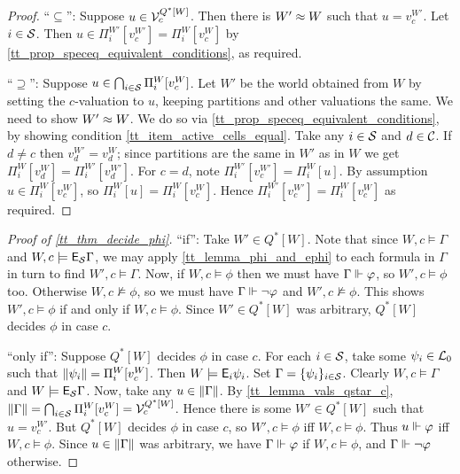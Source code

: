 \begin{proof}
    ``$\subseteq$'': Suppose $u \in \mathcal{V}^{Q^*[W]}_c$. Then there is $W' \approx
    W$ such that $u = v^{W'}_c$. Let $i \in \mathcal{S}$. Then $u \in
    \Pi^{W'}_i[v^{W'}_c] = \Pi^W_i[v^W_c]$ by
    \cref{tt_prop_speceq_equivalent_conditions}, as required.

    ``$\supseteq$'': Suppose $u \in \bigcap_{i \in \mathcal{S}}{\Pi^W_i[v^W_c]}$. Let
    $W'$ be the world obtained from $W$ by setting the $c$-valuation to $u$,
    keeping partitions and other valuations the same. We need to show $W'
    \approx W$. We do so via \cref{tt_prop_speceq_equivalent_conditions}, by
    showing condition \cref{tt_item_active_cells_equal}. Take any $i \in
    \mathcal{S}$ and $d \in \mathcal{C}$. If $d \ne c$ then $v^{W'}_d = v^W_d$; since
    partitions are the same in $W'$ as in $W$ we get $\Pi^W_i[v^W_d] =
    \Pi^{W'}_i[v^{W'}_d]$. For $c = d$, note $\Pi^{W'}_i[v^{W'}_c] =
    \Pi^W_i[u]$. By assumption $u \in \Pi^W_i[v^W_c]$, so $\Pi^W_i[u] =
    \Pi^W_i[v^W_c]$. Hence $\Pi^{W'}_i[v^{W'}_c] = \Pi^W_i[v^W_c]$ as required.
\end{proof}

\begin{proof}[Proof of \cref{tt_thm_decide_phi}]
    ``if'': Take $W' \in Q^*[W]$. Note that since $W, c \models \Gamma$ and $W,
    c \models \mathsf{E}_{\mathcal{S}}\Gamma$, we may apply \cref{tt_lemma_phi_and_ephi} to each
    formula in $\Gamma$ in turn to find $W', c \models \Gamma$. Now, if $W, c
    \models \phi$ then we must have $\Gamma \Vdash \varphi$, so $W', c
    \models \phi$ too. Otherwise $W, c \not\models \phi$, so we must have
    $\Gamma \Vdash \neg\varphi$ and $W', c \not\models \phi$. This shows $W',
    c \models \phi$ if and only if $W, c \models \phi$. Since $W' \in Q^*[W]$
    was arbitrary, $Q^*[W]$ decides $\phi$ in case $c$.

    ``only if'': Suppose $Q^*[W]$ decides $\phi$ in case $c$. For each $i \in
    \mathcal{S}$, take some $\psi_i \in \mathcal{L}_0$ such that $\|{\psi_i}\| =
    \Pi^W_i[v^W_c]$. Then $W \models \mathsf{E}_i\psi_i$. Set $\Gamma = \{\psi_i\}_{i
    \in \mathcal{S}}$. Clearly $W, c \models \Gamma$ and $W \models \mathsf{E}_{\mathcal{S}}\Gamma$.
    Now, take any $u \in \|{\Gamma}\|$. By \cref{tt_lemma_vals_qstar_c},
    $\|{\Gamma}\| = \bigcap_{i \in \mathcal{S}}{\Pi^W_i[v^W_c]} =
    \mathcal{V}^{Q^*[W]}_c$. Hence there is some $W' \in Q^*[W]$ such that $u =
    v^{W'}_c$. But $Q^*[W]$ decides $\phi$ in case $c$, so $W', c \models \phi$
    iff $W, c \models \phi$. Thus $u \Vdash \varphi$ iff $W, c \models \phi$.
    Since $u \in \|{\Gamma}\|$ was arbitrary, we have $\Gamma \Vdash
    \varphi$ if $W, c \models \phi$, and $\Gamma \Vdash \neg\varphi$ otherwise.
\end{proof}

